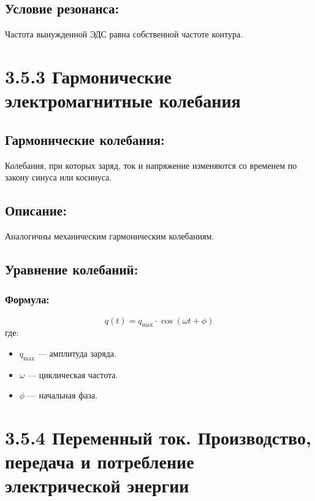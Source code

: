 \documentclass[a4paper,12pt]{article}
\begin{document}
\vspace{-9pt}
\subsection*{Условие резонанса:}
\vspace{-3pt}
Частота вынужденной ЭДС равна собственной частоте контура.

\newpage
\section*{3.5.3 Гармонические электромагнитные колебания}
\vspace{-9pt}
\subsection*{Гармонические колебания:}
\vspace{-3pt}
Колебания, при которых заряд, ток и напряжение изменяются со временем по закону синуса или косинуса.

\vspace{-9pt}
\subsection*{Описание:}
\vspace{-3pt}
Аналогичны механическим гармоническим колебаниям.

\vspace{-9pt}
\subsection*{Уравнение колебаний:}
\vspace{-3pt}
\subsubsection*{Формула:}
\vspace{-0.05em}
$$ q(t) = q_{\text{max}} \cdot \cos(\omega t + \phi) $$
где:
\begin{itemize}
    \item $q_{\text{max}}$ — амплитуда заряда.
    \item $\omega$ — циклическая частота.
    \item $\phi$ — начальная фаза.
\end{itemize}

\newpage
\section*{3.5.4 Переменный ток. Производство, передача и потребление электрической энергии}
\vspace{-9pt}
\end{document}
